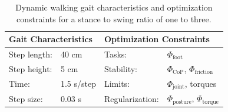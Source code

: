 \begin{table}[t]
\centering
\caption[Dynamic walking gait characteristics and optimization constraints]{Dynamic walking gait characteristics and optimization constraints for a stance to swing ratio of one to three.}
\begin{tabular}{|ll|ll|}
\hline
\multicolumn{2}{|l|}{\textbf{Gait Characteristics}} & \multicolumn{2}{l|}{\textbf{Optimization Constraints}} \\ \hline
Step length:& 40 cm 	& Tasks: 			& $\Phi_{\text{foot}}$\\ \hline
Step height:& 5 cm 	& Stability: 		&$\Phi_{\text{CoP}}$, $\Phi_{\text{friction}}$ \\ \hline
Time:& 1.5 s/step	& Limits: 			& $\Phi_{\text{joint}}$, torques \\ \hline
Step size:& 0.03 s	& Regularization: 	& $\Phi_{\text{posture}}$, $\Phi_{\text{torque}}$\\ \hline
\end{tabular}
\label{tab:walkDynamic}
\end{table} 

